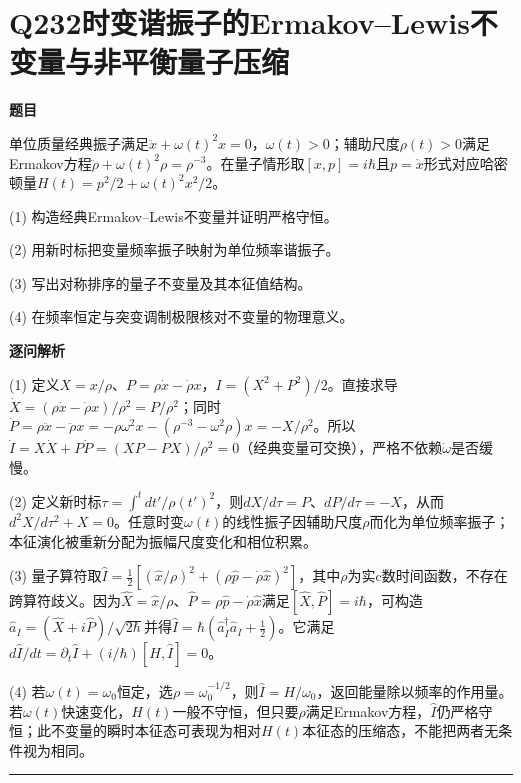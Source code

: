 \documentclass[UTF8,a4paper,11pt,oneside,openany]{ctexbook}
\begin{document}
\section*{Q232\quad 时变谐振子的Ermakov–Lewis不变量与非平衡量子压缩}
\textbf{题目}\par
单位质量经典振子满足$\ddot x+\omega(t)^2x=0$，$\omega(t)>0$；辅助尺度$\rho(t)>0$满足Ermakov方程$\ddot\rho+\omega(t)^2\rho=\rho^{-3}$。在量子情形取$[x,p]=i\hbar$且$p=\dot x$形式对应哈密顿量$H(t)=p^2/2+\omega(t)^2x^2/2$。
\par\smallskip\noindent (1) 构造经典Ermakov–Lewis不变量并证明严格守恒。
\par\smallskip\noindent (2) 用新时标把变量频率振子映射为单位频率谐振子。
\par\smallskip\noindent (3) 写出对称排序的量子不变量及其本征值结构。
\par\smallskip\noindent (4) 在频率恒定与突变调制极限核对不变量的物理意义。
\par\medskip\textbf{逐问解析}\par
\par\smallskip\noindent (1) 定义$X=x/\rho$、$P=\rho\dot x-\dot\rho x$，$I=(X^2+P^2)/2$。直接求导$\dot X=(\rho\dot x-\dot\rho x)/\rho^2=P/\rho^2$；同时$\dot P=\rho\ddot x-\ddot\rho x=-\rho\omega^2x-(\rho^{-3}-\omega^2\rho)x=-X/\rho^2$。所以$\dot I=X\dot X+P\dot P=(XP-PX)/\rho^2=0$（经典变量可交换），严格不依赖$\dot\omega$是否缓慢。
\par\smallskip\noindent (2) 定义新时标$\tau=\int^tdt'/\rho(t')^2$，则$dX/d\tau=P$、$dP/d\tau=-X$，从而$d^2X/d\tau^2+X=0$。任意时变$\omega(t)$的线性振子因辅助尺度$\rho$而化为单位频率振子；本征演化被重新分配为振幅尺度变化和相位积累。
\par\smallskip\noindent (3) 量子算符取$\hat I=\tfrac12[(\hat x/\rho)^2+(\rho\hat p-\dot\rho\hat x)^2]$，其中$\rho$为实c数时间函数，不存在跨算符歧义。因为$\hat X=\hat x/\rho$、$\hat P=\rho\hat p-\dot\rho\hat x$满足$[\hat X,\hat P]=i\hbar$，可构造$\hat a_I=(\hat X+i\hat P)/\sqrt{2\hbar}$并得$\hat I=\hbar(\hat a_I^\dagger\hat a_I+\tfrac12)$。它满足$d\hat I/dt=\partial_t\hat I+(i/\hbar)[H,\hat I]=0$。
\par\smallskip\noindent (4) 若$\omega(t)=\omega_0$恒定，选$\rho=\omega_0^{-1/2}$，则$\hat I=H/\omega_0$，返回能量除以频率的作用量。若$\omega(t)$快速变化，$H(t)$一般不守恒，但只要$\rho$满足Ermakov方程，$\hat I$仍严格守恒；此不变量的瞬时本征态可表现为相对$H(t)$本征态的压缩态，不能把两者无条件视为相同。
\par\medskip\hrule\medskip
\end{document}
